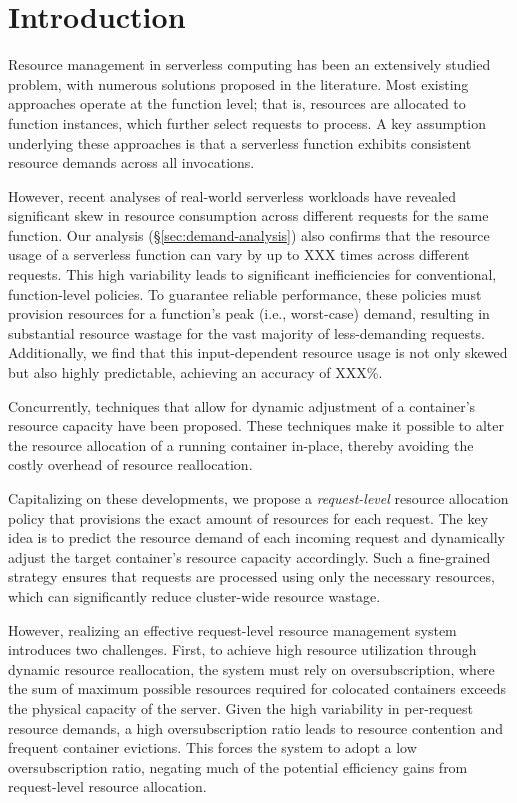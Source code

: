 \section{Introduction}
\label{sec:introduction}


Resource management in serverless computing has been an extensively studied problem, with numerous solutions proposed in the literature.
Most existing approaches operate at the function level; that is, resources are allocated to function instances, which further select requests to process.
A key assumption underlying these approaches is that a serverless function exhibits consistent resource demands across all invocations.

However, recent analyses of real-world serverless workloads have revealed significant skew in resource consumption across different requests for the same function.
Our analysis (\S\ref{sec:demand-analysis}) also confirms that the resource usage of a serverless function can vary by up to XXX times across different requests.
This high variability leads to significant inefficiencies for conventional, function-level policies.
To guarantee reliable performance, these policies must provision resources for a function's peak (i.e., worst-case) demand, resulting in substantial resource wastage for the vast majority of less-demanding requests. 
Additionally, we find that this input-dependent resource usage is not only skewed but also highly predictable, achieving an accuracy of XXX\%.

Concurrently, techniques that allow for dynamic adjustment of a container's resource capacity have been proposed.
These techniques make it possible to alter the resource allocation of a running container in-place, thereby avoiding the costly overhead of resource reallocation.

Capitalizing on these developments, we propose a \textit{request-level} resource allocation policy that provisions the exact amount of resources for each request.
The key idea is to predict the resource demand of each incoming request and dynamically adjust the target container's resource capacity accordingly.
Such a fine-grained strategy ensures that requests are processed using only the necessary resources, which can significantly reduce cluster-wide resource wastage.

However, realizing an effective request-level resource management system introduces two challenges.
First, to achieve high resource utilization through dynamic resource reallocation, the system must rely on oversubscription,
where the sum of maximum possible resources required for colocated containers exceeds the physical capacity of the server.
Given the high variability in per-request resource demands, a high oversubscription ratio leads to resource contention and frequent container evictions.
This forces the system to adopt a low oversubscription ratio, negating much of the potential efficiency gains from request-level resource allocation.

